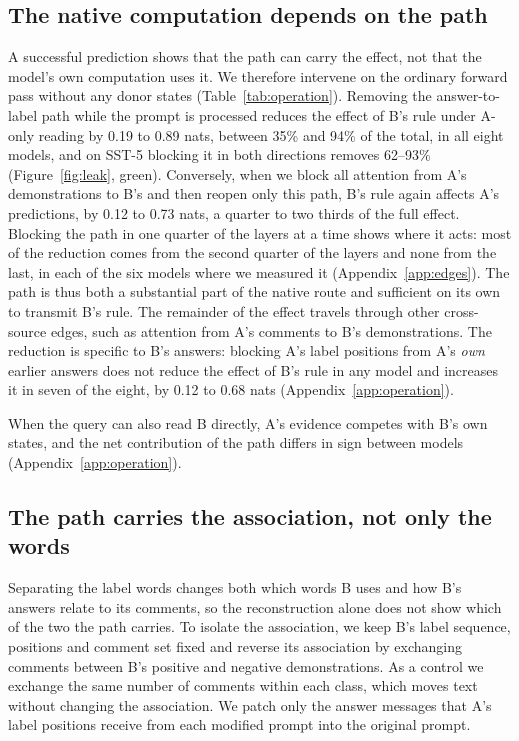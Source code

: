 \documentclass[11pt]{article}
\begin{document}
\subsection{The native computation depends on the path}
\label{sec:native}

A successful prediction shows that the path can carry the effect, not that the model's own computation uses it.
We therefore intervene on the ordinary forward pass without any donor states (Table~\ref{tab:operation}).
Removing the answer-to-label path while the prompt is processed reduces the effect of B's rule under A-only reading by 0.19 to 0.89 nats, between 35\% and 94\% of the total, in all eight models, and on SST-5 blocking it in both directions removes 62--93\% (Figure~\ref{fig:leak}, green).
Conversely, when we block all attention from A's demonstrations to B's and then reopen only this path, B's rule again affects A's predictions, by 0.12 to 0.73 nats, a quarter to two thirds of the full effect.
Blocking the path in one quarter of the layers at a time shows where it acts: most of the reduction comes from the second quarter of the layers and none from the last, in each of the six models where we measured it (Appendix~\ref{app:edges}).
The path is thus both a substantial part of the native route and sufficient on its own to transmit B's rule.
The remainder of the effect travels through other cross-source edges, such as attention from A's comments to B's demonstrations.
The reduction is specific to B's answers: blocking A's label positions from A's \emph{own} earlier answers does not reduce the effect of B's rule in any model and increases it in seven of the eight, by 0.12 to 0.68 nats (Appendix~\ref{app:operation}).

When the query can also read B directly, A's evidence competes with B's own states, and the net contribution of the path differs in sign between models (Appendix~\ref{app:operation}).

\subsection{The path carries the association, not only the words}
\label{sec:assoc}

Separating the label words changes both which words B uses and how B's answers relate to its comments, so the reconstruction alone does not show which of the two the path carries.
To isolate the association, we keep B's label sequence, positions and comment set fixed and reverse its association by exchanging comments between B's positive and negative demonstrations.
As a control we exchange the same number of comments within each class, which moves text without changing the association.
We patch only the answer messages that A's label positions receive from each modified prompt into the original prompt.
\end{document}
